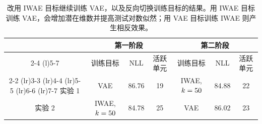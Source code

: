 \begin{table}

\begin{center}
\begin{tabular}{@{}c ccc ccc@{}}
& \multicolumn{3}{c}{第一阶段} & \multicolumn{3}{c}{第二阶段} \\
\cmidrule(r){2-4} \cmidrule(l){5-7} 
& 训练目标   & NLL   & 活跃单元 & 训练目标             & NLL   & 活跃单元 \\ 
\cmidrule(lr){2-2} \cmidrule(lr){3-3} \cmidrule(lr){4-4} \cmidrule(lr){5-5} \cmidrule(lr){6-6} \cmidrule(lr){7-7} \midrule
实验 1 & VAE          & 86.76 & 19           & IWAE, $k=50$           & 84.88 & 22           \\ \midrule
实验 2 & IWAE, $k=50$ & 84.78 & 25           & VAE                    & 86.02 & 23           \\
\bottomrule
\end{tabular}
\end{center}

\caption{改用 IWAE 目标继续训练 VAE，以及反向切换训练目标的结果。用 IWAE 目标训练 VAE，会增加潜在维数并提高测试对数似然；用 VAE 目标训练 IWAE 则产生相反效果。}
\label{tbl:optima}
\end{table}
